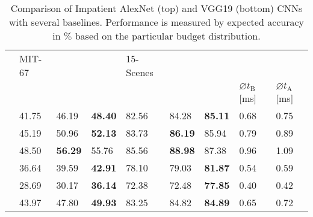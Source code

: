 \documentclass{bmvc2k}
\begin{document}
\begin{table}[tb]
{\begin{tabular}
{                C{0.12\textwidth}C{0.12\textwidth}C{0.12\textwidth}  |
                C{0.12\textwidth}C{0.12\textwidth}
            }
            \toprule
             & MIT-67 &&& 15-Scenes &&& & \\
                &  &  &  
            &  &  &  & $\varnothing t_{\text{B}}$ [ms] & $\varnothing t_{\text{A}}$ [ms]\\ 
            \midrule
                    & 41.75      & 46.19      & \bf{48.40}
                                & 82.56      & 84.28      & \bf{85.11}
                                & 0.68       & 0.75\\
                   & 45.19      & 50.96      & \bf{52.13}
                                & 83.73      & \bf{86.19} & 85.94
                                & 0.79       & 0.89\\
                  & 48.50      & \bf{56.29} & 55.76
                                & 85.56      & \bf{88.98} & 87.38
                                & 0.96       & 1.09\\
                  & 36.64      & 39.59      & \bf{42.91}
                                & 78.10      & 79.03      & \bf{81.87}
                                & 0.54       & 0.59\\
                 & 28.69      & 30.17      & \bf{36.14}
                                & 72.38      & 72.48      & \bf{77.85}
                                & 0.40       & 0.42\\
                  & 43.97      & 47.80      & \bf{49.93}
                                & 83.25      & 84.82      & \bf{84.89}
                                & 0.65       & 0.72\\
            \bottomrule
        \end{tabular}
        }
        \caption{
            Comparison of Impatient AlexNet (top) and VGG19 (bottom) CNNs with several baselines.
            Performance is measured by expected accuracy in $\%$ based on the particular budget distribution.
            \label{tab:experiments:baselinesvgg}
        }

    \end{table}
            
\end{document}
